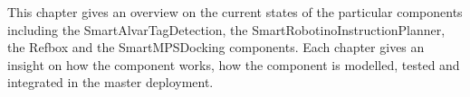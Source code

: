This chapter gives an overview on the current states of the particular components including the SmartAlvarTagDetection, the SmartRobotinoInstructionPlanner, the Refbox and the SmartMPSDocking components. Each chapter gives an insight on how the component works, how the component is modelled, tested and integrated in the master deployment.